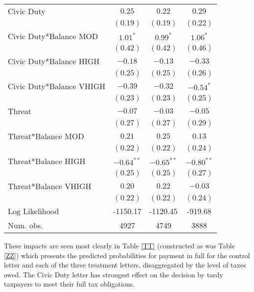 \documentclass[12pt,titlepage]{article}
\begin{document}
\begin{center}
\begin{longtable}{| l | c |  c| c|}
Civic Duty  & $0.25$        & $0.22$        & $0.29$        \\
                  & $(0.19)$      & $(0.19)$      & $(0.22)$      \\
Civic Duty*Balance MOD   & $1.01^{*}$    & $0.99^{*}$    & $1.06^{*}$    \\
                  & $(0.42)$      & $(0.42)$      & $(0.46)$      \\
Civic Duty*Balance HIGH   & $-0.18$       & $-0.13$       & $-0.33$       \\
                  & $(0.25)$      & $(0.25)$      & $(0.26)$      \\
Civic Duty*Balance VHIGH   & $-0.39$       & $-0.32$       & $-0.54^{*}$   \\
                  & $(0.23)$      & $(0.23)$      & $(0.25)$      \\
Threat            & $-0.07$       & $-0.03$       & $-0.05$       \\
                  & $(0.27)$      & $(0.27)$      & $(0.29)$      \\
Threat*Balance MOD & $0.21$        & $0.25$        & $0.13$        \\
                  & $(0.22)$      & $(0.22)$      & $(0.24)$      \\
Threat*Balance HIGH & $-0.64^{**}$  & $-0.65^{**}$  & $-0.80^{**}$  \\
                  & $(0.25)$      & $(0.25)$      & $(0.27)$      \\
Threat*Balance VHIGH & $0.20$        & $0.22$        & $-0.03$       \\
                  & $(0.22)$      & $(0.22)$      & $(0.24)$      \\
\hline
Log Likelihood    & -1150.17      & -1120.45      & -919.68       \\
Num. obs.         & 4927          & 4749          & 3888          \\
\end{longtable}
\end{center}


These impacts are seen most clearly in Table \ref{TT} (constructed as
was Table \ref{ZZ}) which presents the predicted probabilities for
payment in full for the control letter and each of the three treatment
letters, disaggregated by the level of taxes owed.  The Civic Duty
letter has strongest effect on the decision by tardy taxpayers to meet
their full tax obligations.
\end{document}
